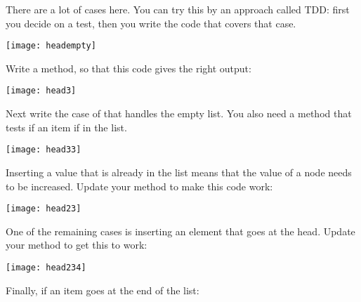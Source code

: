 There are a lot of cases here. You can try this by an approach called
\acf{TDD}: first you decide on a test, then you write the code that
covers that case.


\texttt{[image: headempty]}

\begin{exercise}
  Write a  method, so that this code gives the right
  output:
\end{exercise}


\texttt{[image: head3]}

\begin{exercise}
  Next write the case of  that handles the empty
  list. You also need a method  that tests if an
  item if in the list.
\end{exercise}


\texttt{[image: head33]}

\begin{exercise}
  Inserting a value that is already in the list means that the
   value of a node needs to be increased. Update your
   method to make this code work:
\end{exercise}


\texttt{[image: head23]}

\begin{exercise}
  One of the remaining cases is inserting an element that goes at the
  head. Update your  method to get this to work:
\end{exercise}


\texttt{[image: head234]}

\begin{exercise}
  Finally, if an item goes at the end of the list:
\end{exercise}



